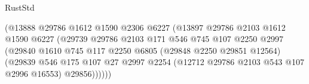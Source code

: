 \begin{lexlean}{RustStd}
\begin{coremodule}
                                                (@13888
                                                  @29786
                                                  @1612
                                                  @1590
                                                  @2306
                                                  @6227
                                                  (@13897
                                                    @29786
                                                    @2103
                                                    @1612
                                                    @1590
                                                    @6227
                                                    (@29739
                                                      @29786
                                                      @2103
                                                      @171
                                                      @546
                                                      @745
                                                      @107
                                                      @2250
                                                      @2997
                                                      (@29840
                                                        @1610
                                                        @745
                                                        @117
                                                        @2250
                                                        @6805
                                                        (@29848 @2250 @29851 @12564)
                                                        (@29839
                                                          @546
                                                          @175
                                                          @107
                                                          @27
                                                          @2997
                                                          @2254
                                                          (@12712
                                                            @29786
                                                            @2103
                                                            @543
                                                            @107
                                                            @2996
                                                            @16553)
                                                          @29856))))))

\end{coremodule}
\end{lexlean}
